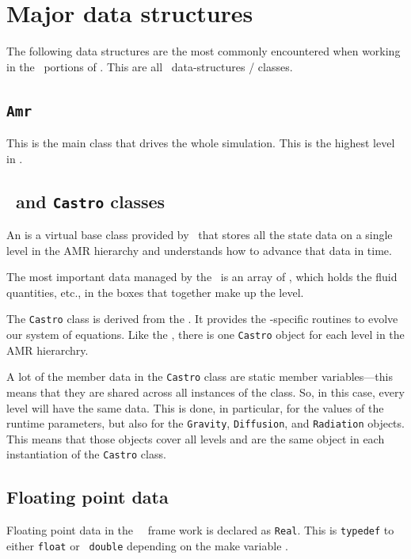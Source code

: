 \section{Major data structures}

The following data structures are the most commonly encountered when
working in the \cpp\ portions of \castro.  This are all
\boxlib\ data-structures / classes.

\subsection{{\tt Amr}}

This is the main class that drives the whole simulation.  This is
the highest level in \castro.


\subsection{\amrlevel\ and {\tt Castro} classes}

An \code{\amrlevel} is a virtual base class provided by \boxlib\ that
stores all the state data on a single level in the AMR hierarchy and
understands how to advance that data in time.

The most important data managed by the \amrlevel\ is an array of
\statedata, which holds the fluid quantities, etc., in the boxes
that together make up the level.

The {\tt Castro} class is derived from the \amrlevel.  It provides
the \castro-specific routines to evolve our system of equations.  Like
the \amrlevel, there is one {\tt Castro} object for each level in the
AMR hierarchry.

A lot of the member data in the {\tt Castro} class are static member
variables---this means that they are shared across all instances of
the class.  So, in this case, every level will have the same data.
This is done, in particular, for the values of the runtime parameters,
but also for the {\tt Gravity}, {\tt Diffusion}, and {\tt Radiation}
objects.  This means that those objects cover all levels and are the
same object in each instantiation of the {\tt Castro} class.

\subsection{Floating point data}

Floating point data in the \cpp\ \boxlib\ frame work is declared as
{\tt Real}.  This is {\tt typedef} to either {\tt float} or {\tt
  double} depending on the make variable .

